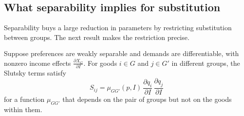 \subsection{What separability implies for substitution}\label{sec:05-gu}

Separability buys a large reduction in parameters by restricting substitution between groups. The next
result makes the restriction precise.

\begin{proposition}\label{prop:05-goldman-uzawa}
Suppose preferences are weakly separable and demands are differentiable, with nonzero income effects
$\frac{\partial X_G}{\partial I}$. For goods $i \in G$ and $j \in G'$ in different groups, the Slutsky
terms satisfy
\begin{equation}\label{eq:05-gu}
  S_{ij} = \mu_{GG'}(p, I)\, \frac{\partial q_i}{\partial I}\, \frac{\partial q_j}{\partial I}
\end{equation}
for a function $\mu_{GG'}$ that depends on the pair of groups but not on the goods within them.
\end{proposition}

